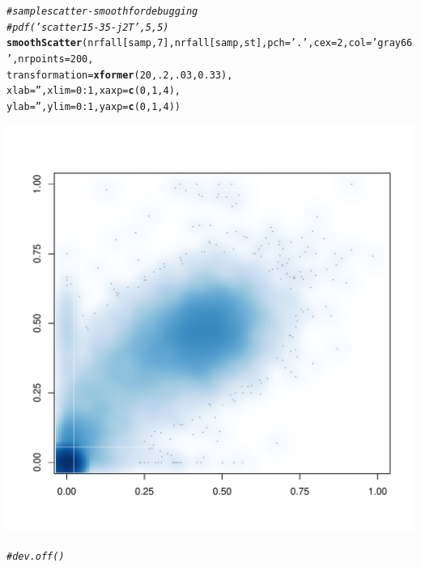 \documentclass{article}\usepackage[]{graphicx}\usepackage[]{color}
\makeatletter
\def\maxwidth{ %
  \ifdim\Gin@nat@width>\linewidth
    \linewidth
  \else
    \Gin@nat@width
  \fi
}
\newcommand{\hlnum}[1]{\textcolor[rgb]{0.686,0.059,0.569}{#1}}%
\newcommand{\hlstr}[1]{\textcolor[rgb]{0.192,0.494,0.8}{#1}}%
\newcommand{\hlcom}[1]{\textcolor[rgb]{0.678,0.584,0.686}{\textit{#1}}}%
\newcommand{\hlopt}[1]{\textcolor[rgb]{0,0,0}{#1}}%
\newcommand{\hlstd}[1]{\textcolor[rgb]{0.345,0.345,0.345}{#1}}%
\newcommand{\hlkwc}[1]{\textcolor[rgb]{0.333,0.667,0.333}{#1}}%
\newcommand{\hlkwd}[1]{\textcolor[rgb]{0.737,0.353,0.396}{\textbf{#1}}}%
\newenvironment{kframe}{%
 \def\at@end@of@kframe{}%
 \ifinner\ifhmode%
  \def\at@end@of@kframe{\end{minipage}}%
  \begin{minipage}{\columnwidth}%
 \fi\fi%
 \def\FrameCommand##1{\hskip\@totalleftmargin \hskip-\fboxsep
 \colorbox{shadecolor}{##1}\hskip-\fboxsep
     \hskip-\linewidth \hskip-\@totalleftmargin \hskip\columnwidth}%
 \MakeFramed {\advance\hsize-\width
   \@totalleftmargin\z@ \linewidth\hsize
   \@setminipage}}%
 {\par\unskip\endMakeFramed%
 \at@end@of@kframe}
\newenvironment{knitrout}{}{} %
\makeatother
\begin{document}
\begin{knitrout}\footnotesize
{}\color{fgcolor}\begin{kframe}
\begin{alltt}
\hlcom{# sample scatter-smooth for debugging }
\hlcom{#pdf('scatter15-35-j2T',5,5)}
\hlkwd{smoothScatter}\hlstd{(nrfall[samp,}\hlnum{7}\hlstd{], nrfall[samp,st],} \hlkwc{pch}\hlstd{=}\hlstr{'.'}\hlstd{,} \hlkwc{cex}\hlstd{=}\hlnum{2}\hlstd{,} \hlkwc{col}\hlstd{=}\hlstr{'gray66'}\hlstd{,} \hlkwc{nrpoints}\hlstd{=}\hlnum{200}\hlstd{,}
              \hlkwc{transformation}\hlstd{=}\hlkwd{xformer}\hlstd{(}\hlnum{20}\hlstd{,}\hlnum{.2}\hlstd{,}\hlnum{.03}\hlstd{,}\hlnum{0.33}\hlstd{),}
              \hlkwc{xlab}\hlstd{=}\hlstr{''}\hlstd{,} \hlkwc{xlim}\hlstd{=}\hlnum{0}\hlopt{:}\hlnum{1}\hlstd{,} \hlkwc{xaxp}\hlstd{=}\hlkwd{c}\hlstd{(}\hlnum{0}\hlstd{,}\hlnum{1}\hlstd{,}\hlnum{4}\hlstd{),}
              \hlkwc{ylab}\hlstd{=}\hlstr{''}\hlstd{,} \hlkwc{ylim}\hlstd{=}\hlnum{0}\hlopt{:}\hlnum{1}\hlstd{,} \hlkwc{yaxp}\hlstd{=}\hlkwd{c}\hlstd{(}\hlnum{0}\hlstd{,}\hlnum{1}\hlstd{,}\hlnum{4}\hlstd{))}
\end{alltt}
\end{kframe}
\includegraphics[width=\maxwidth]{Fig1-mscat-figs/unnamed-chunk-21-1} 
\begin{kframe}\begin{alltt}
\hlcom{#dev.off()}
\end{alltt}
\end{kframe}
\end{knitrout}
\end{document}
